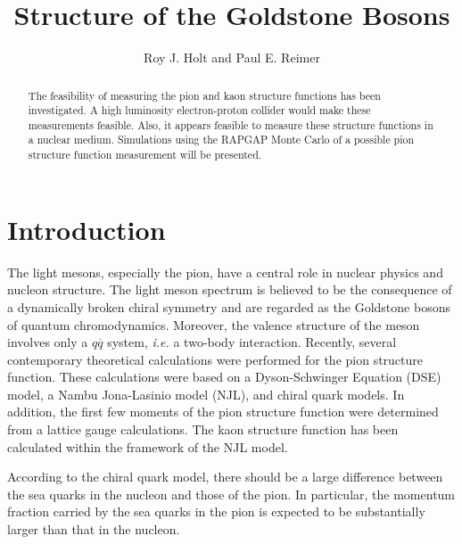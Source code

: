 



\title{Structure of the Goldstone Bosons}

\author{Roy J. Holt and Paul E. Reimer}
\address{Argonne National Laboratory\\
         Argonne, Illinois  60439}

\maketitle

\begin{abstract}
The feasibility of measuring the pion and kaon structure functions has
been investigated.  A high luminosity electron-proton collider would
make these measurements feasible.  Also, it appears feasible to
measure these structure functions in a nuclear medium.  Simulations
using the RAPGAP Monte Carlo of a possible pion structure function
measurement will be presented.
\end{abstract}

\section*{Introduction}


The light mesons, especially the pion, have a central role in nuclear
physics and nucleon structure.  The light meson spectrum is believed
to be the consequence of a dynamically broken chiral symmetry and are
regarded as the Goldstone bosons of quantum chromodynamics.  Moreover,
the valence structure of the meson involves only a $q\overline{q}$
system, {\it i.e.} a two-body interaction.  Recently, several
contemporary theoretical calculations were performed for the pion
structure function.  These calculations were based on a
Dyson-Schwinger Equation (DSE) model\cite{hecht}, a Nambu Jona-Lasinio
model (NJL)\cite{shigetani}, and chiral quark models\cite{weise}.  In
addition, the first few moments of the pion structure function were
determined from a lattice gauge calculations\cite{best}.  The kaon
structure function has been calculated within the framework of the NJL
model\cite{shigetani}.

According to the chiral quark model, there should be a large
difference between the sea quarks in the nucleon and those of the
pion.  In particular, the momentum fraction carried by the sea quarks
in the pion is expected\cite{weise} to be substantially larger than
that in the nucleon.

